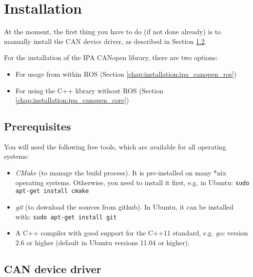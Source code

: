 \chapter{Installation}
\label{chap:installation}

At the moment, the first thing you have to do (if not done already) is to manually install the CAN device driver, as described in Section \ref{chap:installation:devicedriver}.

For the installation of the IPA CANopen library, there are two options:
\begin{itemize}
\item For usage from within ROS (Section \ref{chap:installation:ipa_canopen_ros})
\item For using the C++ library without ROS (Section \ref{chap:installation:ipa_canopen_core})
\end{itemize}

\section{Prerequisites}

You will need the following free tools, which are available for all operating systems:
\begin{itemize}
\item {\em CMake} (to manage the build process). It is pre-installed on many *nix operating systems. Otherwise, you need to install it first, e.g. in Ubuntu:
\texttt{sudo apt-get install cmake}
\item {\em git} (to download the sources from github). In Ubuntu, it can be installed with: \texttt{sudo apt-get install git}
\item A C++ compiler with good support for the C++11 standard, e.g. {\em gcc} version 2.6 or higher (default in Ubuntu versions 11.04 or higher).
\end{itemize}

\section{CAN device driver}
\label{chap:installation:devicedriver}

